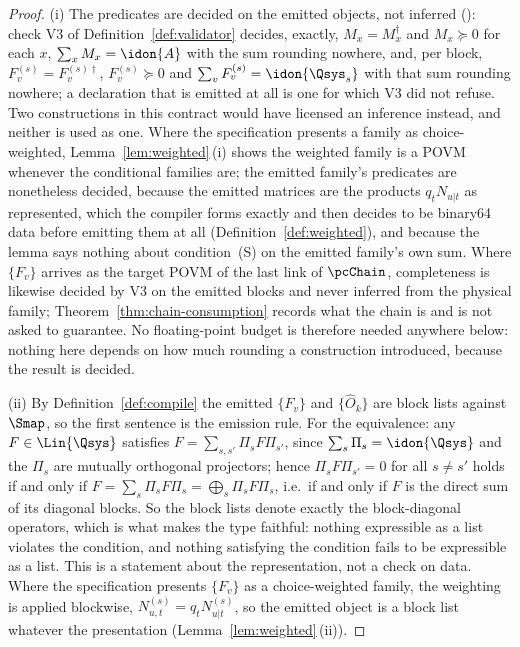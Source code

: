 \begin{proof}
(i) The predicates are decided on the emitted objects, not inferred
(): check V3 of
Definition~\ref{def:validator} decides, exactly, $M_x=M_x^{\dagger}$ and
$M_x\succeq0$ for each $x$, $\sum_xM_x=\idon{A}$ with the sum rounding
nowhere, and, per block, $F_v^{(s)}=F_v^{(s)\dagger}$, $F_v^{(s)}\succeq0$ and
$\sum_vF_v^{(s)}=\idon{\Qsys_s}$ with that sum rounding nowhere; a declaration
that is emitted at all is one for which V3 did not refuse. Two constructions in
this contract would have licensed an inference instead, and neither is used as
one. Where the specification presents a family as choice-weighted,
Lemma~\ref{lem:weighted}\,(i) shows the weighted family is a POVM whenever the
conditional families are; the emitted family's predicates are nonetheless
decided, because the emitted matrices are the products $q_tN_{u|t}$ as
represented, which the compiler forms exactly and then decides to be binary64
data before emitting them at all (Definition~\ref{def:weighted}), and because
the lemma says nothing about condition~(S) on the emitted family's own sum.
Where $\{F_v\}$ arrives as the target POVM of the last link of $\pcChain$,
completeness is likewise decided by V3 on the emitted blocks and never inferred
from the physical family; Theorem~\ref{thm:chain-consumption} records what the chain is and
is not asked to guarantee. No floating-point budget is therefore needed
anywhere below: nothing here depends on how much rounding a construction
introduced, because the result is decided.

(ii) By Definition~\ref{def:compile} the emitted $\{F_v\}$ and $\{\hat O_k\}$
are block lists against $\Smap$, so the first sentence is the emission rule.
For the equivalence: any $F\in\Lin{\Qsys}$ satisfies
$F=\sum_{s,s'}\Pi_sF\Pi_{s'}$, since $\sum_s\Pi_s=\idon{\Qsys}$ and the $\Pi_s$
are mutually orthogonal projectors; hence $\Pi_sF\Pi_{s'}=0$ for all $s\ne s'$
holds if and only if $F=\sum_s\Pi_sF\Pi_s=\bigoplus_s\Pi_sF\Pi_s$, i.e.\ if and
only if $F$ is the direct sum of its diagonal blocks. So the block lists denote
exactly the block-diagonal operators, which is what makes the type faithful:
nothing expressible as a list violates the condition, and nothing satisfying
the condition fails to be expressible as a list. This is a statement about the
representation, not a check on data. Where the specification presents
$\{F_v\}$ as a choice-weighted family, the weighting is applied blockwise,
$N_{u,t}^{(s)}=q_tN_{u|t}^{(s)}$, so the emitted object is a block list
whatever the presentation (Lemma~\ref{lem:weighted}\,(ii)).


\end{proof}
